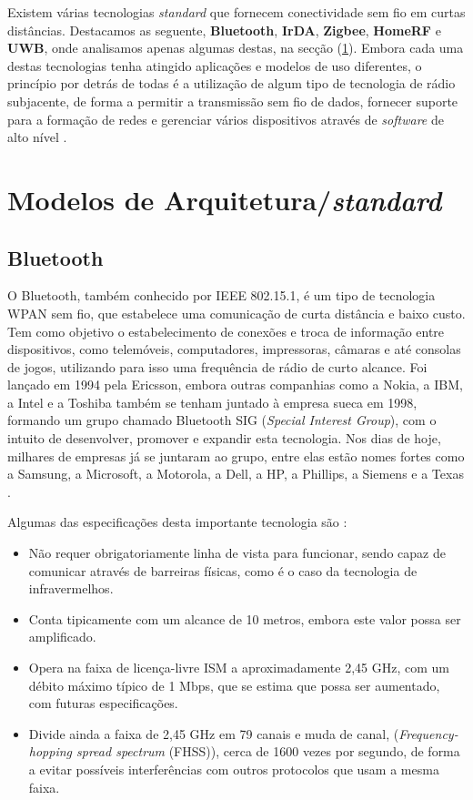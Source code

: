 \documentclass[conference]{IEEEtran}
\begin{document}
Existem várias tecnologias \textit{standard} que fornecem conectividade sem fio em curtas distâncias. 
Destacamos as seguente, \textbf{Bluetooth}, \textbf{IrDA}, \textbf{Zigbee}, \textbf{HomeRF} e \textbf{UWB}, onde analisamos apenas algumas destas, na secção (\ref{arquiteturas}).
Embora cada uma destas tecnologias tenha atingido aplicações e modelos de uso diferentes, o princípio por detrás de todas é a utilização de algum tipo de tecnologia de rádio subjacente, de forma a permitir a transmissão sem fio de dados, fornecer suporte para a formação de redes e gerenciar vários dispositivos através de \textit{software} de alto nível \cite{prasad2004ofdm}.


\section{Modelos de Arquitetura/\textit{standard}} \label{arquiteturas}

\subsection{Bluetooth} \label{bluetooth}

O Bluetooth, também conhecido por IEEE 802.15.1, é um tipo de tecnologia WPAN sem fio, que estabelece uma comunicação de curta distância e baixo custo. 
Tem como objetivo o estabelecimento de conexões e troca de informação entre dispositivos, como telemóveis, computadores, impressoras, câmaras e até consolas de jogos, utilizando para isso uma frequência de rádio de curto alcance. 
Foi lançado em 1994 pela Ericsson, embora outras companhias como a Nokia, a IBM, a Intel e a Toshiba também se tenham juntado à empresa sueca em 1998, formando um grupo chamado Bluetooth SIG (\textit{Special Interest Group}), com o intuito de desenvolver, promover e expandir esta tecnologia. 
Nos dias de hoje, milhares de empresas já se juntaram ao grupo, entre elas estão nomes fortes como a Samsung, a Microsoft, a Motorola, a Dell, a HP, a Phillips, a Siemens e a Texas \cite{bluetoothwiki}.

Algumas das especificações desta importante tecnologia são \cite{kobayashi2004tecnologia}:

\begin{itemize}

 \item Não requer obrigatoriamente linha de vista para funcionar, sendo capaz de comunicar através de barreiras físicas, como é o caso da tecnologia de infravermelhos.
 \item Conta tipicamente com um alcance de 10 metros, embora este valor possa ser amplificado. 
 \item Opera na faixa de licença-livre ISM a aproximadamente 2,45 GHz, com um débito máximo típico de 1 Mbps, que se estima que possa ser aumentado, com futuras especificações.
 \item Divide ainda a faixa de 2,45 GHz em 79 canais e muda de canal, (\textit{Frequency-hopping spread spectrum} (FHSS)), cerca de 1600 vezes por segundo, de forma a evitar possíveis interferências com outros protocolos que usam a mesma faixa.

\end{itemize}
\end{document}
